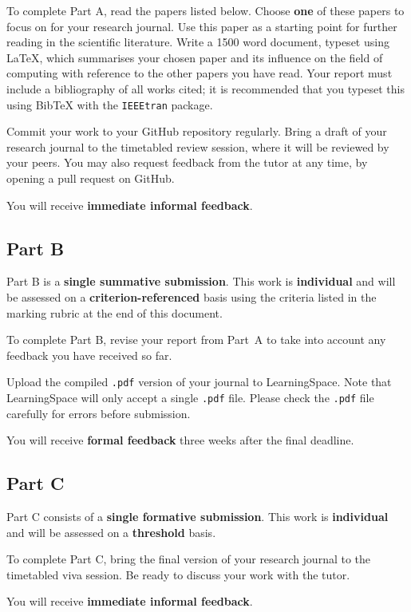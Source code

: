 \documentclass{../../fal_assignment}
\begin{document}
To complete Part A, read the papers listed below.
Choose \textbf{one} of these papers to focus on for your research journal.
Use this paper as a starting point for further reading in the scientific literature.
Write a 1500 word document, typeset using LaTeX,
which summarises your chosen paper and its influence on the field of computing
with reference to the other papers you have read.
Your report must include a bibliography of all works cited;
it is recommended that you typeset this using BibTeX with the \texttt{IEEEtran} package.

Commit your work to your GitHub repository regularly.
Bring a draft of your research journal to the timetabled review session,
where it will be reviewed by your peers.
You may also request feedback from the tutor at any time,
by opening a pull request on GitHub.

You will receive \textbf{immediate informal feedback}.

\subsection*{Part B}

Part B is a \textbf{single summative submission}. This work is \textbf{individual} and will be assessed on a \textbf{criterion-referenced} basis
using the criteria listed in the marking rubric at the end of this document.

To complete Part B, revise your report from Part~A to take into account any feedback you have received so far.

Upload the compiled \texttt{.pdf} version of your journal to LearningSpace.
Note that LearningSpace will only accept a single \texttt{.pdf} file.
Please check the \texttt{.pdf} file carefully for errors before submission.

You will receive \textbf{formal feedback} three weeks after the final deadline.

\subsection*{Part C}

Part C consists of a \textbf{single formative submission}. This work is \textbf{individual} and will be assessed on a \textbf{threshold} basis.

To complete Part C, bring the final version of your research journal to the timetabled viva session.
Be ready to discuss your work with the tutor.

You will receive \textbf{immediate informal feedback}.
\end{document}
